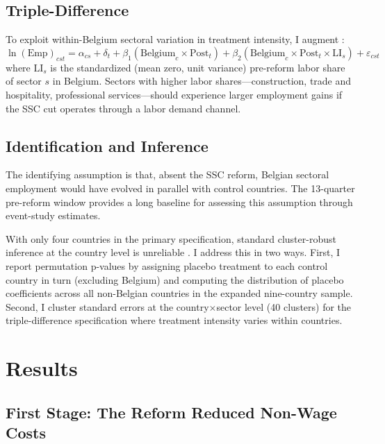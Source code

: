 \documentclass[12pt]{article}
\begin{document}
\subsection{Triple-Difference}

To exploit within-Belgium sectoral variation in treatment intensity, I augment :
\begin{equation}
\ln(\text{Emp})_{cst} = \alpha_{cs} + \delta_t + \beta_1 (\text{Belgium}_c \times \text{Post}_t) + \beta_2 (\text{Belgium}_c \times \text{Post}_t \times \text{LI}_s) + \varepsilon_{cst}
\end{equation}
where $\text{LI}_s$ is the standardized (mean zero, unit variance) pre-reform labor share of sector $s$ in Belgium. Sectors with higher labor shares---construction, trade and hospitality, professional services---should experience larger employment gains if the SSC cut operates through a labor demand channel.

\subsection{Identification and Inference}

The identifying assumption is that, absent the SSC reform, Belgian sectoral employment would have evolved in parallel with control countries. The 13-quarter pre-reform window provides a long baseline for assessing this assumption through event-study estimates.

With only four countries in the primary specification, standard cluster-robust inference at the country level is unreliable \citep{conley2011}. I address this in two ways. First, I report permutation p-values by assigning placebo treatment to each control country in turn (excluding Belgium) and computing the distribution of placebo coefficients across all non-Belgian countries in the expanded nine-country sample. Second, I cluster standard errors at the country$\times$sector level (40 clusters) for the triple-difference specification where treatment intensity varies within countries.

\section{Results} \label{sec:results}

\subsection{First Stage: The Reform Reduced Non-Wage Costs}
\end{document}
